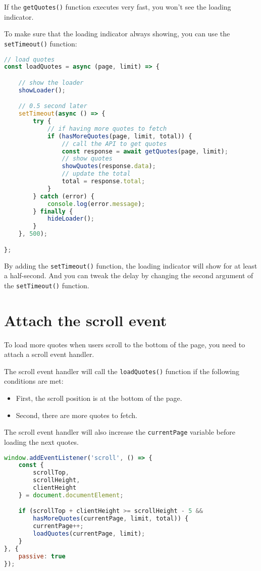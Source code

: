 \documentclass[11pt]{article}
\begin{document}
\noindent
If the \verb|getQuotes()| function executes very fast,
you won't see the loading indicator.
\newpage

\noindent
To make sure that the loading indicator always showing,
you can use the \verb|setTimeout()| function:

\begin{lstlisting}[language=JavaScript]
// load quotes
const loadQuotes = async (page, limit) => {

    // show the loader
    showLoader();

    // 0.5 second later
    setTimeout(async () => {
        try {
            // if having more quotes to fetch
            if (hasMoreQuotes(page, limit, total)) {
                // call the API to get quotes
                const response = await getQuotes(page, limit);
                // show quotes
                showQuotes(response.data);
                // update the total
                total = response.total;
            }
        } catch (error) {
            console.log(error.message);
        } finally {
            hideLoader();
        }
    }, 500);

};
\end{lstlisting}

\noindent
By adding the \verb|setTimeout()| function, the loading indicator will
show for at least a half-second. And you can tweak the delay by
changing the second argument of the \verb|setTimeout()| function.

\section*{Attach the scroll event}

To load more quotes when users scroll to the bottom of the page,
you need to attach a scroll event handler.
\newline

\noindent
The scroll event handler will call the \verb|loadQuotes()| function
if the following conditions are met:
\begin{itemize}
\item First, the scroll position is at the bottom of the page.
\item Second, there are more quotes to fetch.
\end{itemize}
The scroll event handler will also increase the \verb|currentPage|
variable before loading the next quotes.

\begin{lstlisting}[language=JavaScript]
window.addEventListener('scroll', () => {
    const {
        scrollTop,
        scrollHeight,
        clientHeight
    } = document.documentElement;

    if (scrollTop + clientHeight >= scrollHeight - 5 &&
        hasMoreQuotes(currentPage, limit, total)) {
        currentPage++;
        loadQuotes(currentPage, limit);
    }
}, {
    passive: true
});
\end{lstlisting}
\end{document}
